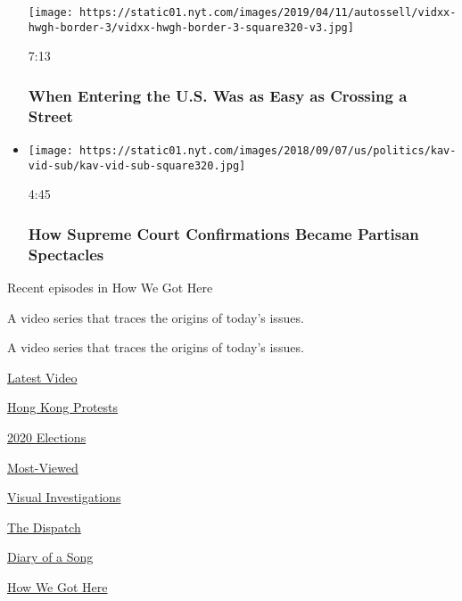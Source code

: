\begin{itemize}
  \texttt{[image: https://static01.nyt.com/images/2019/04/11/autossell/vidxx-hwgh-border-3/vidxx-hwgh-border-3-square320-v3.jpg]}

  7:13

  \hypertarget{when-entering-the-us-was-as-easy-as-crossing-a-street}{%
  \subsubsection{When Entering the U.S. Was as Easy as Crossing a
  Street}\label{when-entering-the-us-was-as-easy-as-crossing-a-street}}
\item
  \href{https://www.nytimes.com/video/us/politics/100000006046278/supreme-court-confirmation-hearing-nominee-senate-history.html?action=click\&module=video-series-bar\&region=header\&pgtype=Article\&playlistId=video/how-we-got-here}{}

  \texttt{[image: https://static01.nyt.com/images/2018/09/07/us/politics/kav-vid-sub/kav-vid-sub-square320.jpg]}

  4:45

  \hypertarget{how-supreme-court-confirmations-became-partisan-spectacles}{%
  \subsubsection{How Supreme Court Confirmations Became Partisan
  Spectacles}\label{how-supreme-court-confirmations-became-partisan-spectacles}}
\end{itemize}

Recent episodes in How We Got Here

A video series that traces the origins of today's issues.

A video series that traces the origins of today's issues.

\href{/video}{}

\href{/video/latest-video}{Latest Video}

\href{/video/hk-protest}{Hong Kong Protests}

\href{/video/2020-Elections}{2020 Elections}

\href{/video/Most-Viewed}{Most-Viewed}

\href{/video/investigations}{Visual Investigations}

\href{/video/on-the-ground}{The Dispatch}

\href{/video/diaryofasong}{Diary of a Song}

\href{/video/how-we-got-here}{How We Got Here}

